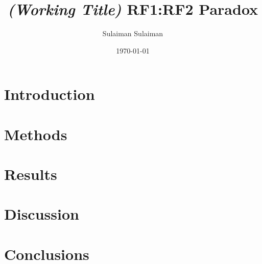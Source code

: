 \documentclass[
    emulatestandardclasses,
    parskip=half,
]{article}
\begin{document}
    \title{\textit{(Working Title)} RF1:RF2 Paradox}
    \date{\today}
    \author{Sulaiman Sulaiman}
    \maketitle

    \begin{abstract}
    \end{abstract}
    \section{Introduction}
    \section{Methods}
    \section{Results}
    \section{Discussion}
    \section{Conclusions}

	\newpage {}
	\printbibliography
	\appendix\appendixpage
\end{document}
